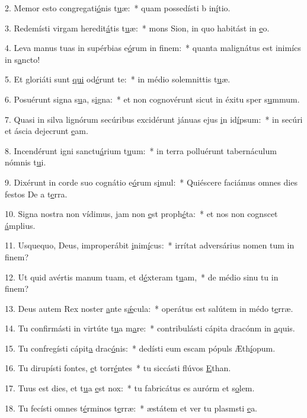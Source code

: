 2. Memor esto congregati\uline{ó}nis t\uline{u}æ:~* quam possedísti b in\uline{í}tio.\par 
3. Redemísti virgam heredit\uline{á}tis t\uline{u}æ:~* mons Sion, in quo habitást in \uline{e}o.\par 
4. Leva manus tuas in supérbias e\uline{ó}rum in f\uline{i}nem:~* quanta malignátus est inimícs in s\uline{a}ncto!\par 
5. Et gloriáti sunt \uline{qui} od\uline{é}runt te:~* in médio solemnittis t\uline{u}æ.\par 
6. Posuérunt signa s\uline{u}a, s\uline{i}gna:~* et non cognovérunt sicut in éxitu sper s\uline{u}mmum.\par 
7. Quasi in silva lignórum secúribus excidérunt jánuas ejus \uline{i}n id\uline{í}psum:~* in secúri et áscia dejecrunt \uline{e}am.\par 
8. Incendérunt igni sanctu\uline{á}rium t\uline{u}um:~* in terra polluérunt tabernáculum nómnis t\uline{u}i.\par 
9. Dixérunt in corde suo cognátio e\uline{ó}rum s\uline{i}mul:~* Quiéscere faciámus omnes dies festos De a t\uline{e}rra.\par 
10. Signa nostra non vídimus, jam non \uline{e}st proph\uline{é}ta:~* et nos non cognscet \uline{á}mplius.\par 
11. Usquequo, Deus, improperábit \uline{i}nim\uline{í}cus:~* irrítat adversárius nomen tum in f\uline{i}nem?\par 
12. Ut quid avértis manum tuam, et d\uline{é}xteram t\uline{u}am,~* de médio sinu tu in f\uline{i}nem?\par 
13. Deus autem Rex noster \uline{a}nte s\uline{ǽ}cula:~* operátus est salútem in médo t\uline{e}rræ.\par 
14. Tu confirmásti in virtúte t\uline{u}a m\uline{a}re:~* contribulásti cápita dracónm in \uline{a}quis.\par 
15. Tu confregísti cápit\uline{a} drac\uline{ó}nis:~* dedísti eum escam pópuls Æth\uline{í}opum.\par 
16. Tu dirupísti fontes, \uline{e}t torr\uline{é}ntes~* tu siccásti flúvos \uline{E}than.\par 
17. Tuus est dies, et t\uline{u}a \uline{e}st nox:~* tu fabricátus es aurórm et s\uline{o}lem.\par 
18. Tu fecísti omnes t\uline{é}rminos t\uline{e}rræ:~* æstátem et ver tu plasmsti \uline{e}a.\par 
